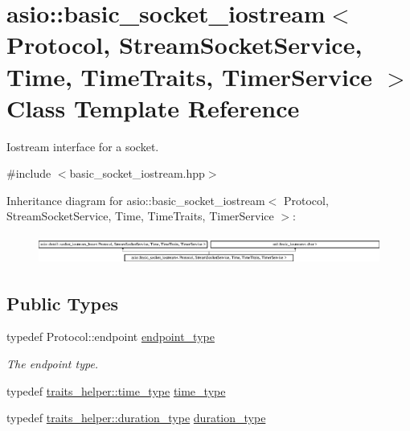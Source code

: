 \hypertarget{classasio_1_1basic__socket__iostream}{}\section{asio\+:\+:basic\+\_\+socket\+\_\+iostream$<$ Protocol, Stream\+Socket\+Service, Time, Time\+Traits, Timer\+Service $>$ Class Template Reference}
\label{classasio_1_1basic__socket__iostream}


Iostream interface for a socket.  




{\ttfamily \#include $<$basic\+\_\+socket\+\_\+iostream.\+hpp$>$}

Inheritance diagram for asio\+:\+:basic\+\_\+socket\+\_\+iostream$<$ Protocol, Stream\+Socket\+Service, Time, Time\+Traits, Timer\+Service $>$\+:\begin{figure}[H]
\begin{center}
\leavevmode
\includegraphics[height=0.941176cm]{classasio_1_1basic__socket__iostream}
\end{center}
\end{figure}
\subsection*{Public Types}
\begin{DoxyCompactItemize}
\item 
typedef Protocol\+::endpoint \hyperlink{classasio_1_1basic__socket__iostream_a7c5f21f11ac0d35b00935ba750b8ed4d}{endpoint\+\_\+type}
\begin{DoxyCompactList}\small\item\em The endpoint type. \end{DoxyCompactList}\item 
typedef \hyperlink{structasio_1_1detail_1_1chrono__time__traits_a19c14f4d45a8b164d2ea4590eebc1c10}{traits\+\_\+helper\+::time\+\_\+type} \hyperlink{classasio_1_1basic__socket__iostream_a1f1cbdf5a23170d9d7b4a03f4dcf1a03}{time\+\_\+type}
\item 
typedef \hyperlink{structasio_1_1detail_1_1chrono__time__traits_a7f122a7cb603e7516bb6595016960775}{traits\+\_\+helper\+::duration\+\_\+type} \hyperlink{classasio_1_1basic__socket__iostream_af9d3e684e0709c574a1d92f7013e1b36}{duration\+\_\+type}
\end{DoxyCompactItemize}
